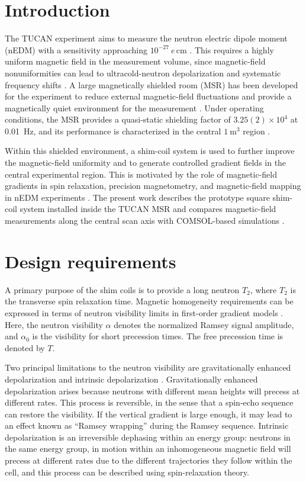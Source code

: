 \documentclass[preprint,12pt]{elsarticle}
\begin{document}
\section{Introduction}\label{sec1}

The TUCAN experiment aims to measure the neutron electric dipole moment (nEDM) with a sensitivity approaching $10^{-27}~e\,\mathrm{cm}$ \cite{bib:npn}. This requires a highly uniform magnetic field in the measurement volume, since magnetic-field nonuniformities can lead to ultracold-neutron depolarization and systematic frequency shifts \cite{pendlebury2015,bib:Abel2019,bib:Abel2022Mapping}. A large magnetically shielded room (MSR) has been developed for the experiment to reduce external magnetic-field fluctuations and provide a magnetically quiet environment for the measurement \cite{bib:inprep}. Under operating conditions, the MSR provides a quasi-static shielding factor of $3.25(2)\times10^{4}$ at 0.01~Hz, and its performance is characterized in the central $1~\mathrm{m}^{3}$ region \cite{bib:msr_rsi}.

Within this shielded environment, a shim-coil system is used to further improve the magnetic-field uniformity and to generate controlled gradient fields in the central experimental region. This is motivated by the role of magnetic-field gradients in spin relaxation, precision magnetometry, and magnetic-field mapping in nEDM experiments \cite{bib:Abel2019,bib:Abel2020CsMag,bib:Abel2022Mapping}. The present work describes the prototype square shim-coil system installed inside the TUCAN MSR and compares magnetic-field measurements along the central scan axis with COMSOL-based simulations \cite{bib:comsol}.

\section{Design requirements}\label{sec2}

A primary purpose of the shim coils is to provide a long neutron $T_2$, where $T_2$ is the transverse spin relaxation time. Magnetic homogeneity requirements can be expressed in terms of neutron visibility limits in first-order gradient models \cite{bib:Abel2019}. Here, the neutron visibility $\alpha$ denotes the normalized Ramsey signal amplitude, and $\alpha_0$ is the visibility for short precession times. The free precession time is denoted by $T$.

Two principal limitations to the neutron visibility are gravitationally enhanced depolarization and intrinsic depolarization \cite{bib:Abel2019}. Gravitationally enhanced depolarization arises because neutrons with different mean heights will precess at different rates. This process is reversible, in the sense that a spin-echo sequence can restore the visibility. If the vertical gradient is large enough, it may lead to an effect known as ``Ramsey wrapping'' during the Ramsey sequence. Intrinsic depolarization is an irreversible dephasing within an energy group: neutrons in the same energy group, in motion within an inhomogeneous magnetic field will precess at different rates due to the different trajectories they follow within the cell, and this process can be described using spin-relaxation theory.
\end{document}
